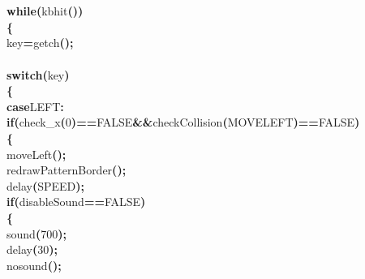 \documentclass[a4paper, 10pt]{article}
\newcommand\SPC{\hspace*{0.6em}}
\newcommand{\CppAIdentifier}[1]{#1}
\newcommand{\CppANumber}[1]{\textcolor[rgb]{0.5,0,0.5}{#1}}
\newcommand{\CppAReservedWord}[1]{\textbf{#1}}
\newcommand{\CppASpace}[1]{\colorbox[rgb]{1,1,1}{#1}}
\newcommand{\CppASymbol}[1]{\textbf{\textcolor[rgb]{1,0,0}{#1}}}
\begin{document}
\begin{ttfamily}
\\
\\
\CppASpace{\SPC \SPC }\CppAReservedWord{while}\CppASymbol{(}\CppAIdentifier{kbhit}\CppASymbol{(}\CppASymbol{)}\CppASymbol{)}\\
\CppASpace{\SPC \SPC }\CppASymbol{\{}\\
\CppASpace{\SPC \SPC \SPC }\CppAIdentifier{key}\CppASymbol{=}\CppAIdentifier{getch}\CppASymbol{(}\CppASymbol{)}\CppASymbol{;}\\
\\
\CppASpace{\SPC \SPC \SPC }\CppAReservedWord{switch}\CppASymbol{(}\CppAIdentifier{key}\CppASymbol{)}\\
\CppASpace{\SPC \SPC \SPC }\CppASymbol{\{}\\
\CppASpace{\SPC \SPC \SPC \SPC }\CppAReservedWord{case}\CppASpace{\SPC }\CppAIdentifier{LEFT}\CppASymbol{:}\\
\CppASpace{\SPC \SPC \SPC \SPC }\CppAReservedWord{if}\CppASymbol{(}\CppAIdentifier{check\_x}\CppASymbol{(}\CppANumber{0}\CppASymbol{)}\CppASymbol{==}\CppAIdentifier{FALSE}\CppASpace{\SPC }\CppASymbol{\&\&}\CppASpace{\SPC }\CppAIdentifier{checkCollision}\CppASymbol{(}\CppAIdentifier{MOVELEFT}\CppASymbol{)}\CppASymbol{==}\CppAIdentifier{FALSE}\CppASpace{\SPC }\CppASymbol{)}\\
\CppASpace{\SPC \SPC \SPC \SPC }\CppASymbol{\{}\\
\CppASpace{\SPC \SPC \SPC \SPC \SPC }\CppAIdentifier{moveLeft}\CppASymbol{(}\CppASymbol{)}\CppASymbol{;}\\
\CppASpace{\SPC \SPC \SPC \SPC \SPC }\CppAIdentifier{redrawPatternBorder}\CppASymbol{(}\CppASymbol{)}\CppASymbol{;}\\
\CppASpace{\SPC \SPC \SPC \SPC \SPC }\CppAIdentifier{delay}\CppASymbol{(}\CppAIdentifier{SPEED}\CppASymbol{)}\CppASymbol{;}\\
\CppASpace{\SPC \SPC \SPC \SPC \SPC }\CppAReservedWord{if}\CppASymbol{(}\CppAIdentifier{disableSound}\CppASymbol{==}\CppAIdentifier{FALSE}\CppASymbol{)}\\
\CppASpace{\SPC \SPC \SPC \SPC \SPC }\CppASymbol{\{}\\
\CppASpace{\SPC \SPC \SPC \SPC \SPC \SPC }\CppAIdentifier{sound}\CppASymbol{(}\CppANumber{700}\CppASymbol{)}\CppASymbol{;}\\
\CppASpace{\SPC \SPC \SPC \SPC \SPC \SPC }\CppAIdentifier{delay}\CppASymbol{(}\CppANumber{30}\CppASymbol{)}\CppASymbol{;}\\
\CppASpace{\SPC \SPC \SPC \SPC \SPC \SPC }\CppAIdentifier{nosound}\CppASymbol{(}\CppASymbol{)}\CppASymbol{;}\\

\end{ttfamily}
\end{document}
